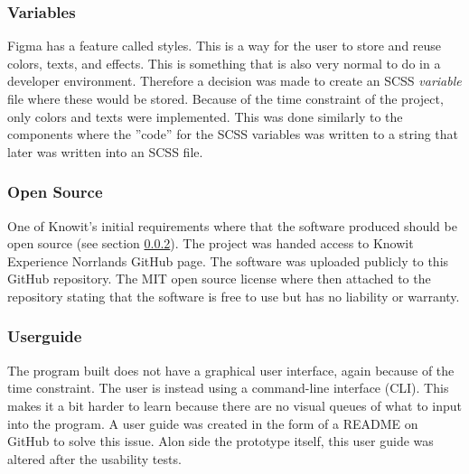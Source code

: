 \subsubsection{Variables}%
\label{ssub:Variables}
Figma has a feature called styles. This is a way for the user to store and reuse colors, texts, and effects. This is something that is also very normal to do in a developer environment. Therefore a decision was made to create an SCSS \textit{variable} file where these would be stored. Because of the time constraint of the project, only colors and texts were implemented. This was done similarly to the components where the ''code'' for the SCSS variables was written to a string that later was written into an SCSS file. 


\subsubsection{Open Source}%
\label{ssub:Open Source}
One of Knowit's initial requirements where that the software produced should be open source (see section \ref{ssub:Open Source}). The project was handed access to Knowit Experience Norrlands GitHub page. The software was uploaded publicly to this GitHub repository\cite{KnowitExperienceNorrlandFigmaConverter2021}. The MIT\cite{MITLicenseOpen} open source license where then attached to the repository stating that the software is free to use but has no liability or warranty.
 
\subsubsection{Userguide}%
\label{ssub:Userguide}
The program built does not have a graphical user interface, again because of the time constraint. The user is instead using a command-line interface (CLI). This makes it a bit harder to learn because there are no visual queues of what to input into the program.  A user guide was created in the form of a README on GitHub\cite{BuildSoftwareBetter} to solve this issue. Alon side the prototype itself, this user guide was altered after the usability tests.




